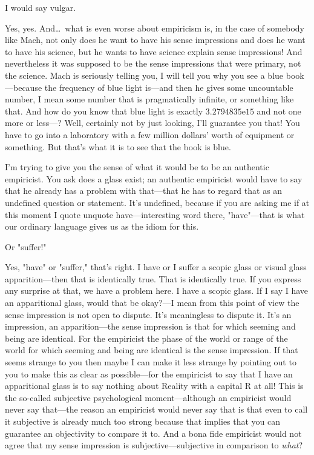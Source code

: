  I would say vulgar. 

 Yes, yes. And\ldots\ what is even worse about empiricism is, in the 
case of somebody like Mach, not only does he want to have his sense 
impressions and does he want to have his science, but he wants to have 
science explain sense impressions! And nevertheless it was supposed to 
be the sense impressions that were primary, not the science. Mach is 
seriously telling you, I will tell you why you see a blue book---because 
the frequency of blue light is---and then he gives some uncountable 
number, I mean some number that is pragmatically infinite, or something 
like that. And how do you know that blue light is exactly 
$3.2794835\mathrm{e}{15}$ and not one more or less---? Well, 
certainly not by just looking, I'll guarantee you that! You have to go 
into a laboratory with a few million dollars' worth of equipment or 
something. But that's what it is to see that the book is blue. 

I'm trying to give you the sense of what it would be to be an 
authentic empiricist. You ask does a glass exist; an authentic empiricist 
would have to say that he already has a problem with that---that he has 
to regard that as an undefined question or statement. It's undefined, 
because if you are asking me if at this moment I quote unquote 
have---interesting word there, "have"---that is what our ordinary 
language gives us as the idiom for this. 

 Or "suffer!" 

 Yes, "have" or "suffer," that's right. I have or I suffer a scopic 
glass or visual glass apparition---then that is identically true. That is 
identically true. If you express any surprise at that, we have a problem 
here. I have a scopic glass. If I say I have an apparitional glass, would 
that be okay?---I mean from this point of view the sense impression is 
not open to dispute. It's meaningless to dispute it. It's an impression, an 
apparition---the sense impression is that for which seeming and being 
are identical. For the empiricist the phase of the world or range of the 
world for which seeming and being are identical is the sense impression. 
If that seems strange to you then maybe I can make it less strange by 
pointing out to you to make this as clear as possible---for the empiricist 
to say that I have an apparitional glass is to say nothing about Reality 
with a capital R at all! This is the so-called subjective psychological 
moment---although an empiricist would never say that---the reason an 
empiricist would never say that is that even to call it subjective is 
already much too strong because that implies that you can guarantee 
an objectivity to compare it to. And a bona fide empiricist would not 
agree that my sense impression is subjective---subjective in comparison 
to \emph{what}? 

